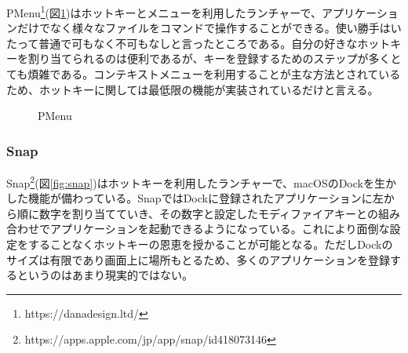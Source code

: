 PMenu\footnote{https://danadesign.ltd/}(図\ref{fig:pmenu})はホットキーとメニューを利用したランチャーで、アプリケーションだけでなく様々なファイルをコマンドで操作することができる。使い勝手はいたって普通で可もなく不可もなしと言ったところである。自分の好きなホットキーを割り当てられるのは便利であるが、キーを登録するためのステップが多くとても煩雑である。コンテキストメニューを利用することが主な方法とされているため、ホットキーに関しては最低限の機能が実装されているだけと言える。

\begin{figure}[h]
    \begin{center}
    \end{center}
    \caption{PMenu}
    \label{fig:pmenu}
\end{figure}

\subsubsection{Snap}

Snap\footnote{https://apps.apple.com/jp/app/snap/id418073146}(図\ref{fig:snap})はホットキーを利用したランチャーで、macOSのDockを生かした機能が備わっている。SnapではDockに登録されたアプリケーションに左から順に数字を割り当てていき、その数字と設定したモディファイアキーとの組み合わせでアプリケーションを起動できるようになっている。これにより面倒な設定をすることなくホットキーの恩恵を授かることが可能となる。ただしDockのサイズは有限であり画面上に場所もとるため、多くのアプリケーションを登録するというのはあまり現実的ではない。

